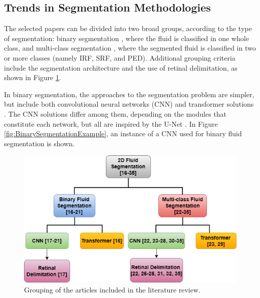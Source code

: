 \subsection{Trends in Segmentation Methodologies}\label{FluidSegmentationLiteratureReview}
The selected papers can be divided into two broad groups, according to the type of segmentation: binary segmentation \parencite{Quek2022, Pawan2021, Liu2021, Guo2020, Wang2021, Wu2023}, where the fluid is classified in one whole class, and multi-class segmentation \parencite{Rahil2023, Hassan2021a, Zhang2023, Sappa2021, Xing2022, Tang2022, Padilla2022, Hu2019, Mantel2021, Liu2024, Li2023, Gao2019, Hassan2021b, Lu2019}, where the segmented fluid is classified in two or more classes (namely IRF, SRF, and PED). Additional grouping criteria include the segmentation architecture and the use of retinal delimitation, as shown in Figure \ref{fig:ArticlesSelection}.
\par
In binary segmentation, the approaches to the segmentation problem are simpler, but include both convolutional neural networks (CNN) \parencite{Pawan2021, Liu2021, Guo2020, Wang2021, Wu2023} and transformer solutions \parencite{Quek2022}. The CNN solutions differ among them, depending on the modules that constitute each network, but all are inspired by the U-Net \parencite{Ronneberger2015}. In Figure \ref{fig:BinarySegmentationExample}, an instance of a CNN used for binary fluid segmentation is shown.
\begin{figure}[!ht]
	\centering
	\includegraphics[width=0.75\linewidth]{figures/ArticlesSelection.png}
	\caption{Grouping of the articles included in the literature review.}
	\label{fig:ArticlesSelection}
\end{figure}
